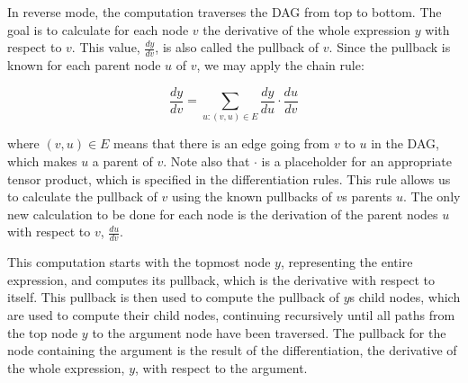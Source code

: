 \documentclass[12pt, a4paper]{report}
\begin{document}
In reverse mode, the computation traverses the DAG from top to bottom.
The goal is to calculate for each node $v$ the derivative of the whole expression $y$ with respect to $v$.
This value, $\frac{dy}{dv}$, is also called the pullback of $v$.
Since the pullback is known for each parent node $u$ of $v$, we may apply the chain rule:

\begin{equation}
    \frac{dy}{dv} = \sum_{u: (v,u) \in E} \frac{dy}{du} \cdot \frac{du}{dv}
    \label{eq:diff}
\end{equation}

where $(v,u) \in E$ means that there is an edge going from $v$ to $u$ in the DAG, which makes $u$ a parent of $v$. 
Note also that $\cdot$ is a placeholder for an appropriate tensor product, which is specified in the differentiation rules. 
This rule allows us to calculate the pullback of $v$ using the known pullbacks of $v$s parents $u$.
The only new calculation to be done for each node is the derivation of the parent nodes $u$ with respect to $v$, $\frac{du}{dv}$.

This computation starts with the topmost node $y$, representing the entire expression, and computes its pullback, which is the derivative with respect to itself.
This pullback is then used to compute the pullback of $y$s child nodes, which are used to compute their child nodes, continuing recursively until all paths from the top node $y$ to the argument node have been traversed.
The pullback for the node containing the argument is the result of the differentiation, the derivative of the whole expression, $y$, with respect to the argument.
\end{document}
